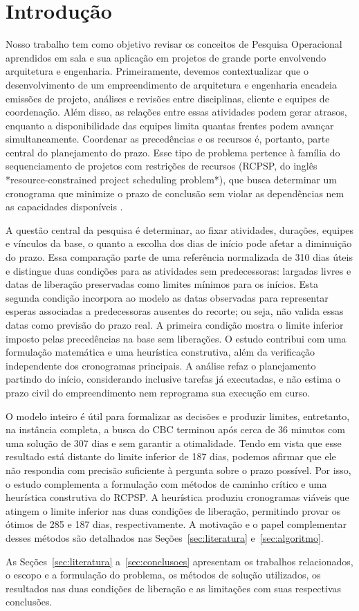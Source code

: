 
\section{Introdução}
\label{sec:introducao}

Nosso trabalho tem como objetivo revisar os conceitos de Pesquisa Operacional aprendidos em sala e sua aplicação em projetos de grande porte envolvendo arquitetura e engenharia. Primeiramente, devemos contextualizar que o desenvolvimento de um empreendimento de arquitetura e engenharia encadeia emissões de projeto, análises e revisões entre disciplinas, cliente e equipes de coordenação. Além disso, as relações entre essas atividades podem gerar atrasos, enquanto a disponibilidade das equipes limita quantas frentes podem avançar simultaneamente. Coordenar as precedências e os recursos é, portanto, parte central do planejamento do prazo. Esse tipo de problema pertence à família do sequenciamento de projetos com restrições de recursos (RCPSP, do inglês *resource-constrained project scheduling problem*), que busca determinar um cronograma que minimize o prazo de conclusão sem violar as dependências nem as capacidades disponíveis \cite{ding2023extensions}.

A questão central da pesquisa é determinar, ao fixar atividades, durações, equipes e vínculos da base, o quanto a escolha dos dias de início pode afetar a diminuição do prazo. Essa comparação parte de uma referência normalizada de 310 dias úteis e distingue duas condições para as atividades sem predecessoras: largadas livres e datas de liberação preservadas como limites mínimos para os inícios. Esta segunda condição incorpora ao modelo as datas observadas para representar esperas associadas a predecessoras ausentes do recorte; ou seja, não valida essas datas como previsão do prazo real. A primeira condição mostra o limite inferior imposto pelas precedências na base sem liberações. O estudo contribui com uma formulação matemática e uma heurística construtiva, além da verificação independente dos cronogramas principais. A análise refaz o planejamento partindo do início, considerando inclusive tarefas já executadas, e não estima o prazo civil do empreendimento nem reprograma sua execução em curso.

O modelo inteiro é útil para formalizar as decisões e produzir limites, entretanto, na instância completa, a busca do CBC terminou após cerca de 36 minutos com uma solução de 307 dias e sem garantir a otimalidade. Tendo em vista que esse resultado está distante do limite inferior de 187 dias, podemos afirmar que ele não respondia com precisão suficiente à pergunta sobre o prazo possível. Por isso, o estudo complementa a formulação com métodos de caminho crítico e uma heurística construtiva do RCPSP. A heurística produziu cronogramas viáveis que atingem o limite inferior nas duas condições de liberação, permitindo provar os ótimos de 285 e 187 dias, respectivamente. A motivação e o papel complementar desses métodos são detalhados nas Seções~\ref{sec:literatura} e~\ref{sec:algoritmo}.

As Seções~\ref{sec:literatura} a~\ref{sec:conclusoes} apresentam os trabalhos relacionados, o escopo e a formulação do problema, os métodos de solução utilizados, os resultados nas duas condições de liberação e as limitações com suas respectivas conclusões.
